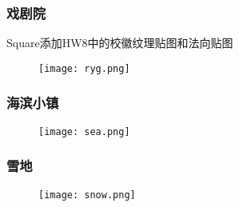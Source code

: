 \documentclass[14pt]{scrartcl} %
\begin{document}
\subsubsection{戏剧院}
Square添加HW8中的校徽纹理贴图和法向贴图
\begin{figure}[h] %
	\centering
	\texttt{[image: ryg.png]} %
\end{figure}

\pagebreak

\subsubsection{海滨小镇}

\begin{figure}[h] %
	\centering
	\texttt{[image: sea.png]} %
\end{figure}

\subsubsection{雪地}

\begin{figure}[h] %
	\centering
	\texttt{[image: snow.png]} %
\end{figure}
\end{document}
